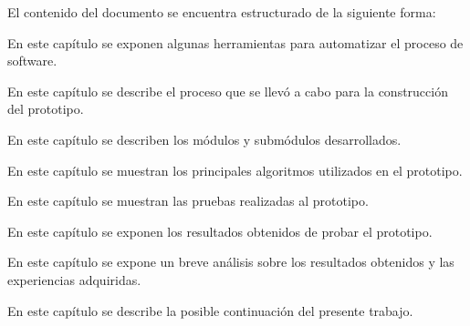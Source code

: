 	El contenido del documento se encuentra estructurado de la siguiente forma:

\begin{Citemize}
	\item {} En este capítulo se exponen algunas herramientas para automatizar el proceso de software.
	\item {} En este capítulo se describe el proceso que se llevó a cabo para la construcción del prototipo.
	\item {} En este capítulo se describen los módulos y submódulos desarrollados.
	\item {} En este capítulo se muestran los principales algoritmos utilizados en el prototipo.
	\item {} En este capítulo se muestran las pruebas realizadas al prototipo.
	\item {} En este capítulo se exponen los resultados obtenidos de probar el prototipo.
	\item {} En este capítulo se expone un breve análisis sobre los resultados obtenidos y las experiencias adquiridas.
	\item {} En este capítulo se describe la posible continuación del presente trabajo.

\end{Citemize}



